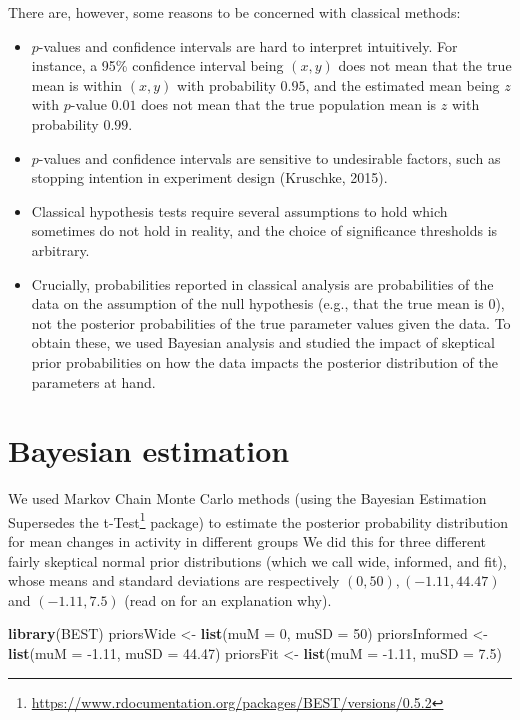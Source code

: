 \documentclass[10pt,]{scrartcl}
\newenvironment{Shaded}{\begin{snugshade}}{\end{snugshade}}
\newcommand{\KeywordTok}[1]{\textcolor[rgb]{0.13,0.29,0.53}{\textbf{#1}}}
\newcommand{\DataTypeTok}[1]{\textcolor[rgb]{0.13,0.29,0.53}{#1}}
\newcommand{\DecValTok}[1]{\textcolor[rgb]{0.00,0.00,0.81}{#1}}
\newcommand{\FloatTok}[1]{\textcolor[rgb]{0.00,0.00,0.81}{#1}}
\newcommand{\StringTok}[1]{\textcolor[rgb]{0.31,0.60,0.02}{#1}}
\newcommand{\NormalTok}[1]{#1}
\begin{document}
There are, however, some reasons to be concerned with classical methods:

\begin{itemize}
\item
  \(p\)-values and confidence intervals are hard to interpret
  intuitively. For instance, a 95\% confidence interval being \((x,y)\)
  does not mean that the true mean is within \((x,y)\) with probability
  \(0.95\), and the estimated mean being \(z\) with \(p\)-value \(0.01\)
  does not mean that the true population mean is \(z\) with probability
  \(0.99\).
\item
  \(p\)-values and confidence intervals are sensitive to undesirable
  factors, such as stopping intention in experiment design (Kruschke,
  2015).
\item
  Classical hypothesis tests require several assumptions to hold which
  sometimes do not hold in reality, and the choice of significance
  thresholds is arbitrary.
\item
  Crucially, probabilities reported in classical analysis are
  probabilities of the data on the assumption of the null hypothesis
  (e.g., that the true mean is 0), not the posterior probabilities of
  the true parameter values given the data. To obtain these, we used
  Bayesian analysis and studied the impact of skeptical prior
  probabilities on how the data impacts the posterior distribution of
  the parameters at hand.
\end{itemize}

\section{Bayesian estimation}

We used Markov Chain Monte Carlo methods (using the
\textsf{Bayesian Estimation Supersedes the t-Test}\footnote{\url{https://www.rdocumentation.org/packages/BEST/versions/0.5.2}}
package) to estimate the posterior probability distribution for mean
changes in activity in different groups We did this for three different
fairly skeptical normal prior distributions (which we call
\textsf{wide, informed}, and \textsf{fit}), whose means and standard
deviations are respectively \((0,50), (-1.11,44.47)\) and
\((-1.11,7.5)\) (read on for an explanation why).

\footnotesize

\begin{Shaded}
\begin{Highlighting}[]
\KeywordTok{library}\NormalTok{(BEST)}
\NormalTok{priorsWide <-}\StringTok{ }\KeywordTok{list}\NormalTok{(}\DataTypeTok{muM =} \DecValTok{0}\NormalTok{, }\DataTypeTok{muSD =} \DecValTok{50}\NormalTok{)}
\NormalTok{priorsInformed <-}\StringTok{ }\KeywordTok{list}\NormalTok{(}\DataTypeTok{muM =} \FloatTok{-1.11}\NormalTok{, }\DataTypeTok{muSD =} \FloatTok{44.47}\NormalTok{)}
\NormalTok{priorsFit <-}\StringTok{ }\KeywordTok{list}\NormalTok{(}\DataTypeTok{muM =} \FloatTok{-1.11}\NormalTok{, }\DataTypeTok{muSD =} \FloatTok{7.5}\NormalTok{)}
\end{Highlighting}
\end{Shaded}
\end{document}
